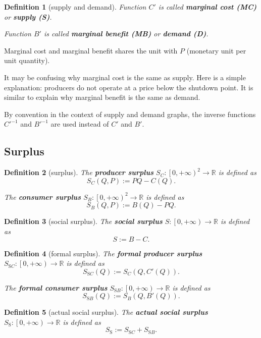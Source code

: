 \documentclass{article}
\newtheorem{definition}{Definition}[subsection]
\begin{document}
\begin{definition}[supply and demand]
Function $C'$ is called \textbf{marginal cost (MC)} or \textbf{supply (S)}.

Function $B'$ is called \textbf{marginal benefit (MB)} or \textbf{demand (D)}.
\end{definition}

Marginal cost and marginal benefit shares the unit with $P$
(monetary unit per unit quantity).

It may be confusing why marginal cost is the same as supply.
Here is a simple explanation: producers do not operate at a price below the shutdown point.
It is similar to explain why marginal benefit is the same as demand.

By convention in the context of supply and demand graphs, the inverse functions $C'^{-1}$ and $B'^{-1}$ are used instead of $C'$ and $B'$.

\subsection{Surplus}

\begin{definition}[surplus]
\label{surplus}
The \textbf{producer surplus} $S_C:\left[0,+\infty\right)^2\to\mathbb R$ is defined as
$$S_C\!\left(Q,P\right):=PQ-C\!\left(Q\right).$$

The \textbf{consumer surplus} $S_B:\left[0,+\infty\right)^2\to\mathbb R$ is defined as
$$S_B\!\left(Q,P\right):=B\!\left(Q\right)-PQ.$$
\end{definition}

\begin{definition}[social surplus]
\label{social surplus}
The \textbf{social surplus} $S:\left[0,+\infty\right)\to\mathbb R$ is defined as
$$S:=B-C.$$
\end{definition}

\begin{definition}[formal surplus]
\label{formal surplus}
The \textbf{formal producer surplus} $S_{\mathrm SC}:\left[0,+\infty\right)\to\mathbb R$ is defined as
$$S_{\mathrm SC}\!\left(Q\right):=S_C\!\left(Q,C'\!\left(Q\right)\right).$$

The \textbf{formal consumer surplus} $S_{\mathrm SB}:\left[0,+\infty\right)\to\mathbb R$ is defined as
$$S_{\mathrm SB}\!\left(Q\right):=S_B\!\left(Q,B'\!\left(Q\right)\right).$$
\end{definition}

\begin{definition}[actual social surplus]
\label{actual social surplus}
The \textbf{actual social surplus} $S_\mathrm S:\left[0,+\infty\right)\to\mathbb R$ is defined as
$$S_\mathrm S:=S_{\mathrm SC}+S_{\mathrm SB}.$$
\end{definition}
\end{document}
